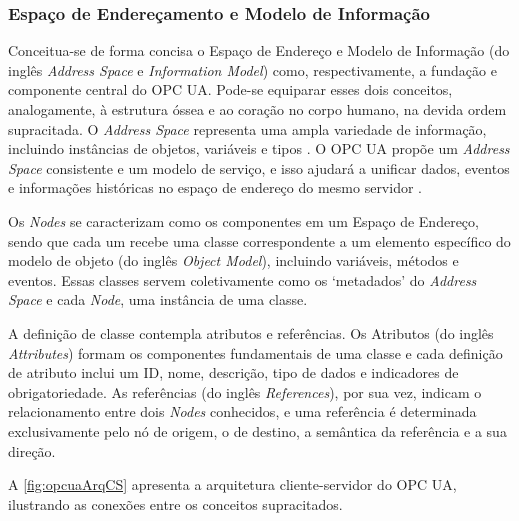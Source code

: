         \subsubsection{Espaço de Endereçamento e Modelo de Informação}

        Conceitua-se de forma concisa o Espaço de Endereço e Modelo de Informação (do inglês \textit{Address Space} e \textit{Information Model}) como, respectivamente, a fundação e componente central do OPC UA. Pode-se equiparar esses dois conceitos, analogamente, à estrutura óssea e ao coração no corpo humano, na devida ordem supracitada. O \textit{Address Space} representa uma ampla variedade de informação, incluindo instâncias de objetos, variáveis e tipos \cite{gong2020}. O OPC UA propõe um \textit{Address Space} consistente e um modelo de serviço, e isso ajudará a unificar dados, eventos e informações históricas no espaço de endereço do mesmo servidor \cite{ren2019}.
        
        Os \textit{Nodes} se caracterizam como os componentes em um Espaço de Endereço, sendo que cada um recebe uma classe correspondente a um elemento específico do modelo de objeto (do inglês \textit{Object Model}), incluindo variáveis, métodos e eventos. Essas classes servem coletivamente como os `metadados' do \textit{Address Space} e cada \textit{Node}, uma instância de uma classe. 
        
        A definição de classe contempla atributos e referências. Os Atributos (do inglês \textit{Attributes}) formam os componentes fundamentais de uma classe e cada definição de atributo inclui um ID, nome, descrição, tipo de dados e indicadores de obrigatoriedade. As referências (do inglês \textit{References}), por sua vez, indicam o relacionamento entre dois \textit{Nodes} conhecidos, e uma referência é determinada exclusivamente pelo nó de origem, o de destino, a semântica da referência e a sua direção.

        A \autoref{fig:opcuaArqCS} apresenta a arquitetura cliente-servidor do OPC UA, ilustrando as conexões entre os conceitos supracitados.

